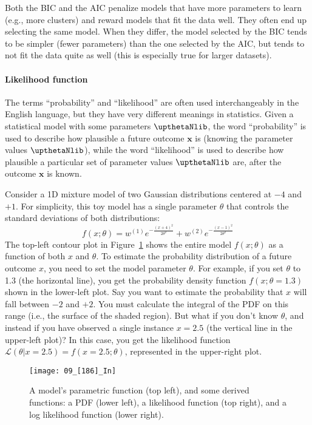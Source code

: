 Both the BIC and the AIC penalize models that have more parameters to learn (e.g., more clusters) and reward models that fit the data well. They often end up selecting the same model. When they differ, the model selected by the BIC tends to be simpler (fewer parameters) than the one selected by the AIC, but tends to not fit the data quite as well (this is especially true for larger datasets).
\paragraph{Likelihood function}
The terms ``probability'' and ``likelihood'' are often used interchangeably in the English language, but they have very different meanings in statistics. Given a statistical model with some parameters $\boldtheta$, the word ``probability'' is used to describe how plausible a future outcome $\mathbf{x}$ is (knowing the parameter values $\boldtheta$), while the word ``likelihood'' is used to describe how plausible a particular set of parameter values $\boldtheta$ are, after the outcome $\mathbf{x}$ is known.

Consider a 1D mixture model of two Gaussian distributions centered at $-4$ and $+1$. For simplicity, this toy model has a single parameter $\theta$ that controls the standard deviations of both distributions:
\begin{equation}
f(x;\theta)=w^{(1)}e^{-\frac{{(x+4)}^2}{2\theta^2}}+w^{(2)}e^{-\frac{{(x-1)}^2}{2\theta^2}}
\end{equation}
The top-left contour plot in Figure~\ref{09_[186]_In} shows the entire model $f(x;\theta)$ as a function of both $x$ and $\theta$. To estimate the probability distribution of a future outcome $x$, you need to set the model parameter $\theta$. For example, if you set $\theta$ to 1.3 (the horizontal line), you get the probability density function $f(x;\theta=1.3)$ shown in the lower-left plot. Say you want to estimate the probability that $x$ will fall between $-2$ and $+2$. You must calculate the integral of the PDF on this range (i.e., the surface of the shaded region). But what if you don't know $\theta$, and instead if you have observed a single instance $x=2.5$ (the vertical line in the upper-left plot)? In this case, you get the likelihood function $\mathcal{L}(\theta|x=2.5)=f(x=2.5;\theta)$, represented in the upper-right plot.
\begin{figure}[h!t]
\centering
\texttt{[image: 09\_[186]\_In]}
\caption{A model's parametric function (top left), and some derived functions: a PDF (lower left), a likelihood function (top right), and a log likelihood function (lower right).}\label{09_[186]_In}
\end{figure}

